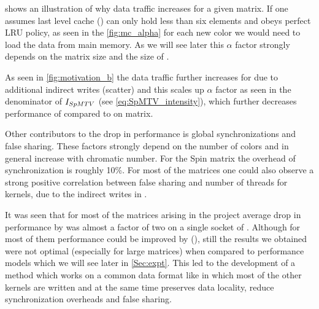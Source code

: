     shows an illustration of why data traffic increases for a given matrix. If one assumes last level cache (\LLC) can only hold less than six elements and obeys perfect LRU policy, as seen in the \cref{fig:mc_alpha} for  each new color we would need to load the data from main memory. As we will see later this $\alpha$ factor strongly depends on the matrix size and the size of \LLC.
  
 As seen in \cref{fig:motivation_b} the data traffic further increases for \SpMTV due to additional indirect writes (scatter) and this scales up $\alpha$ factor as seen in the denominator of $I_{SpMTV}$ (see \cref{eq:SpMTV_intensity}),  which further decreases performance of \SpMTV compared to \SpMV on \MC matrix. 
 
 Other contributors to the drop in performance is global synchronizations and false sharing. These factors strongly depend on the number of colors and in general increase with chromatic number. For the Spin matrix the overhead of synchronization is roughly 10\%.  For most of the matrices one could also observe a strong positive correlation between false sharing and number of threads for \SpMTV kernels, due to the indirect writes in \SpMTV.

It was seen that for most of the matrices arising in the project average drop in performance by \MCfull was almost a factor of two on a single socket of \IVB. Although for most of them performance could be improved by \ABMCfull (\ABMC), still the results we obtained were not optimal (especially for large matrices) when compared to performance models which we will see later in \cref{Sec:expt}. This led to the development of a method which works on a common data format like \CRS in which most of the other kernels are written and at the same time preserves data locality, reduce synchronization overheads and false sharing.


 

